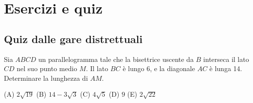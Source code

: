 \chapter{Esercizi e quiz}
\label{ch:quiz}


\section{Quiz dalle gare distrettuali}
\label{sec:quiz_gare_distrettuali}

\begin{esercizio}
    \label{ex:distrettuale_2023_10}
    Sia $ABCD$ un parallelogramma tale che la bisettrice uscente da $B$ interseca il lato $CD$ nel suo punto medio $M$.
    Il lato $BC$ è lungo 6, e la diagonale $AC$ è lunga 14.
    Determinare la lunghezza di $AM$.

    (A) $2\sqrt {19}$ \quad
    (B) $14 - 3\sqrt{3}$ \quad
    (C) $4\sqrt{5}$ \quad
    (D) $9$ \quad
    (E) $2\sqrt{22}$
\end{esercizio}


